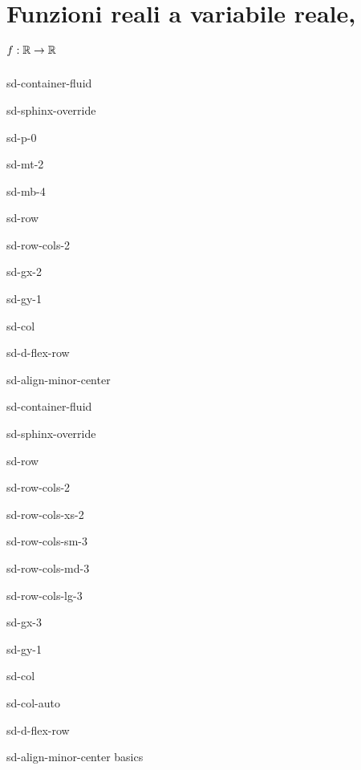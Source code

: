 \documentclass[letterpaper,10pt,english]{jupyterBook}
\begin{document}
\chapter{Funzioni reali a variabile reale, \protect\(f: \mathbb{R} \rightarrow \mathbb{R}\protect\)}
\label{\detokenize{ch/precalculus/real-functions:funzioni-reali-a-variabile-reale-f-mathbb-r-rightarrow-mathbb-r}}\label{\detokenize{ch/precalculus/real-functions:math-hs-precalculus-real-functions}}\label{\detokenize{ch/precalculus/real-functions::doc}}
\sphinxstepscope

\begin{sphinxuseclass}{sd-container-fluid}
\begin{sphinxuseclass}{sd-sphinx-override}
\begin{sphinxuseclass}{sd-p-0}
\begin{sphinxuseclass}{sd-mt-2}
\begin{sphinxuseclass}{sd-mb-4}
\begin{sphinxuseclass}{sd-row}
\begin{sphinxuseclass}{sd-row-cols-2}
\begin{sphinxuseclass}{sd-gx-2}
\begin{sphinxuseclass}{sd-gy-1}
\begin{sphinxuseclass}{sd-col}
\begin{sphinxuseclass}{sd-d-flex-row}
\begin{sphinxuseclass}{sd-align-minor-center}
\begin{sphinxuseclass}{sd-container-fluid}
\begin{sphinxuseclass}{sd-sphinx-override}
\begin{sphinxuseclass}{sd-row}
\begin{sphinxuseclass}{sd-row-cols-2}
\begin{sphinxuseclass}{sd-row-cols-xs-2}
\begin{sphinxuseclass}{sd-row-cols-sm-3}
\begin{sphinxuseclass}{sd-row-cols-md-3}
\begin{sphinxuseclass}{sd-row-cols-lg-3}
\begin{sphinxuseclass}{sd-gx-3}
\begin{sphinxuseclass}{sd-gy-1}
\begin{sphinxuseclass}{sd-col}
\begin{sphinxuseclass}{sd-col-auto}
\begin{sphinxuseclass}{sd-d-flex-row}
\begin{sphinxuseclass}{sd-align-minor-center}
\sphinxAtStartPar
basics


\end{sphinxuseclass}
\end{sphinxuseclass}
\end{sphinxuseclass}
\end{sphinxuseclass}
\end{sphinxuseclass}
\end{sphinxuseclass}
\end{sphinxuseclass}
\end{sphinxuseclass}
\end{sphinxuseclass}
\end{sphinxuseclass}
\end{sphinxuseclass}
\end{sphinxuseclass}
\end{sphinxuseclass}
\end{sphinxuseclass}
\end{sphinxuseclass}
\end{sphinxuseclass}
\end{sphinxuseclass}
\end{sphinxuseclass}
\end{sphinxuseclass}
\end{sphinxuseclass}
\end{sphinxuseclass}
\end{sphinxuseclass}
\end{sphinxuseclass}
\end{sphinxuseclass}
\end{sphinxuseclass}
\end{sphinxuseclass}
\end{document}

